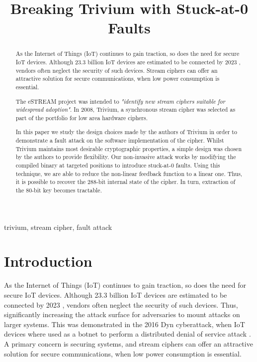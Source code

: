 \documentclass[conference]{IEEEtran}
\begin{document}
\title{Breaking Trivium with Stuck-at-0 Faults}

\author{
}

\maketitle

\begin{abstract}
As the Internet of Things (IoT) continues to gain traction, so does the need for secure IoT devices. Although 23.3 billion IoT devices are estimated to be connected by 2023 \cite{iot}, vendors often neglect the security of such devices. Stream ciphers can offer an attractive solution for secure communications, when low power consumption is essential. 

The eSTREAM project was intended to \textit{"identify new stream ciphers suitable for widespread adoption"}.\cite{call} In 2008, Trivium, a synchronous stream cipher was selected as part of the portfolio for low area hardware ciphers. 

In this paper we study the design choices made by the authors of Trivium in order to demonstrate a fault attack on the software implementation of the cipher. Whilst Trivium maintains most desirable cryptographic properties, a simple design was chosen by the authors to provide flexibility. Our non-invasive attack works by modifying the compiled binary at targeted positions to introduce stuck-at-0 faults. Using this technique, we are able to reduce the non-linear feedback function to a linear one. Thus, it is possible to recover the 288-bit internal state of the cipher. In turn, extraction of the 80-bit key becomes tractable.
\end{abstract}

\begin{IEEEkeywords}
trivium, stream cipher, fault attack
\end{IEEEkeywords}

\section{Introduction}
As the Internet of Things (IoT) continues to gain traction, so does the need for secure IoT devices. Although 23.3 billion IoT devices are estimated to be connected by 2023 \cite{iot}, vendors often neglect the security of such devices. Thus, significantly increasing the attack surface for adversaries to mount attacks on larger systems. This was demonstrated in the 2016 Dyn cyberattack, when IoT devices where used as a botnet to perform a distributed denial of service attack \cite{dyn}. A primary concern is securing systems, and stream ciphers can offer an attractive solution for secure communications, when low power consumption is essential.
\end{document}

